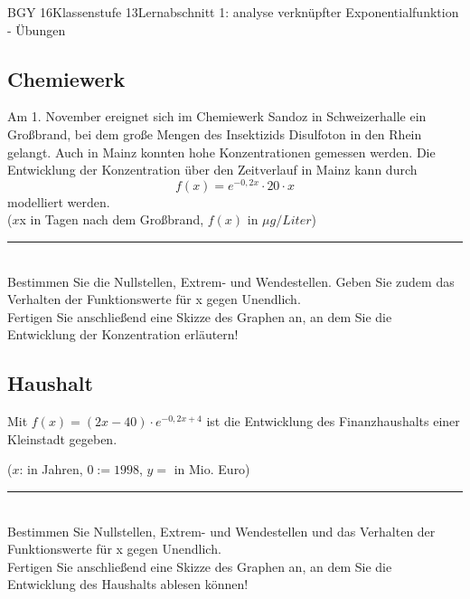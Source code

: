 \documentclass[oneside,openany,headings=optiontotoc,11pt,numbers=noenddot]{scrreprt}
\begin{document}
\begin{worksheet}{BGY 16}{Klassenstufe 13}{Lernabschnitt 1: analyse verknüpfter Exponentialfunktion - Übungen}
\begin{framed}
			\section*{Chemiewerk}
			Am 1. November ereignet sich im Chemiewerk Sandoz in Schweizerhalle ein Großbrand, bei dem große Mengen des Insektizids \grqq{}Disulfoton\grqq{} in den Rhein gelangt. Auch in Mainz konnten hohe Konzentrationen gemessen werden. Die Entwicklung der Konzentration über den Zeitverlauf in Mainz kann durch \[f(x) = e^{-0,2x}\cdot{}20\cdot{}x\] modelliert werden.\\
			(\(x\)x in Tagen nach dem Großbrand, \(f(x)\) in \(\mu{}g/Liter\))\\
			\par\noindent
			\rule{\textwidth}{0.1pt}\\
			Bestimmen Sie die Nullstellen, Extrem- und Wendestellen. Geben Sie zudem das Verhalten der Funktionswerte für x gegen Unendlich.\\
			Fertigen Sie anschließend eine Skizze des Graphen an, an dem Sie die Entwicklung der Konzentration erläutern!
		\end{framed}
		\begin{framed}
			\noindent
			\section*{Haushalt}
			Mit \(f(x) = (2x-40)\cdot{}e^{-0,2x+4}\) ist die Entwicklung des Finanzhaushalts einer Kleinstadt gegeben.\\
			\par\noindent
			(\(x\): in Jahren, \(0:= 1998\), \(y = \) in Mio. Euro)\\
			\par\noindent
			\rule{\textwidth}{0.1pt}\\
			Bestimmen Sie Nullstellen, Extrem- und Wendestellen und das Verhalten der Funktionswerte für x gegen Unendlich.\\
			Fertigen Sie anschließend eine Skizze des Graphen an, an dem Sie die Entwicklung des Haushalts ablesen können!
		\end{framed}
		\begin{framed}
			\noindent

\end{framed}
\end{worksheet}
\end{document}

